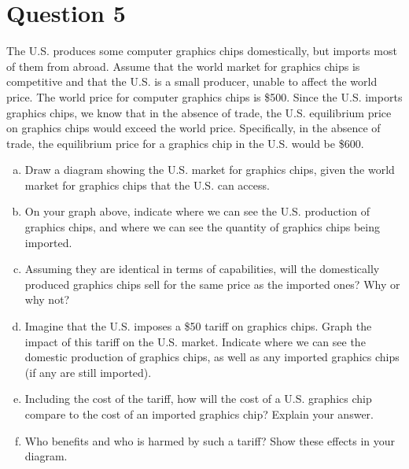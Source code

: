 \documentclass{article}
\newcommand{\question}[1]{\pagebreak\section{Question #1}}
\begin{document}
\pagebreak

\question{5}

The U.S. produces some computer graphics chips domestically, but
imports most of them from abroad. Assume that the world market for
graphics chips is competitive and that the U.S. is a small producer,
unable to affect the world price. The world price for computer graphics
chips is \$500. Since the U.S. imports graphics chips, we know that
in the absence of trade, the U.S. equilibrium price on graphics chips
would exceed the world price. Specifically, in the absence of trade, the
equilibrium price for a graphics chip in the U.S. would be \$600.

\begin{enumerate}[(a)]
    \item Draw a diagram showing the U.S. market for graphics chips, given the world market for graphics chips that the U.S. can access.
    \item On your graph above, indicate where we can see the U.S. production of graphics chips, and where we can see the quantity of graphics chips being imported.
    \item Assuming they are identical in terms of capabilities, will the domestically produced graphics chips sell for the same price as the imported ones? Why or why not?
    \item Imagine that the U.S. imposes a \$50 tariff on graphics chips. Graph the impact of this tariff on the U.S. market. Indicate where we can see the domestic production of graphics chips, as well as any imported graphics chips (if any are still imported).
    \item Including the cost of the tariff, how will the cost of a U.S. graphics chip compare to the cost of an imported graphics chip? Explain your answer.
    \item Who benefits and who is harmed by such a tariff? Show these effects in your diagram.
\end{enumerate}
\end{document}
